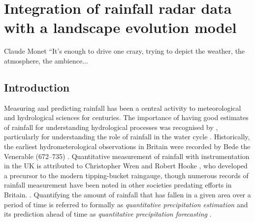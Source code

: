 \chapter{Integration of rainfall radar data with a landscape evolution model}
\label{chapter_metdata}

% 
%
\begin{chapquote}{Claude Monet \textit{}}
``It's enough to drive one crazy, trying to depict the weather, the atmosphere, the ambience...
\end{chapquote}

\section{Introduction}

Measuring and predicting rainfall has been a central activity to meteorological and hydrological sciences for centuries. The importance of having good estimates of rainfall for understanding hydrological processes was recognised by \citet{perrault1674}, particularly for understanding the role of rainfall in the water cycle \citep{biswas1970history}. Historically, the earliest hydrometerological observations in Britain were recorded by Bede the Venerable (672--735) \citep{mcculloch1993history}. Quantitative measurement of rainfall with instrumentation in the UK is attributed to Christopher Wren and Robert Hooke \citep{biswas1970history}, who developed a precursor to the modern tipping-bucket raingauge, though numerous records of rainfall measurement have been noted in other societies predating efforts in Britain. \citep{strangeways2010history}. Quantifying the amount of rainfall that has fallen in a given area over a period of time is referred to formally as \textit{quantitative precipitation estimation} \citep{fabry2015radar} and its prediction ahead of time as \textit{quantitative precipitation forecasting} \citep{golding2000quantitative,browning2003quantitative}.

